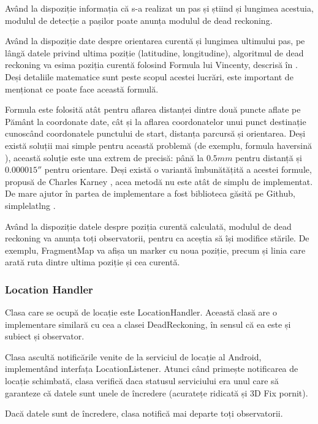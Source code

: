\documentclass[12pt, a4paper, oneside]{article}
\begin{document}
Având la dispoziție informația că s-a realizat un pas și știind și lungimea acestuia, modulul de detecție a pașilor poate anunța modulul de dead reckoning.

Având la dispoziție date despre orientarea curentă și lungimea ultimului pas, pe lângă datele privind ultima poziție (latitudine, longitudine), algoritmul de dead reckoning va esima poziția curentă folosind Formula lui Vincenty, descrisă în \cite{VincentyFormulae}. Deși detaliile matematice sunt peste scopul acestei lucrări, este important de menționat ce poate face această formulă. 

Formula este folosită atât pentru aflarea distanței dintre două puncte aflate pe Pământ la coordonate date, cât și la aflarea coordonatelor unui punct destinație cunoscând coordonatele punctului de start, distanța parcursă și orientarea. Deși există soluții mai simple pentru această problemă (de exemplu, formula haversină \cite{HaversineFormula}), această soluție este una extrem de precisă: până la $0.5mm$ pentru distanță și $0.000015″$ pentru orientare. Deși există o variantă îmbunătățită a acestei formule, propusă de Charles Karney \cite{Karney2013}, acea metodă nu este atât de simplu de implementat. De mare ajutor în partea de implementare a fost biblioteca găsită pe Github, simplelatlng \cite{simplelatlng}.

Având la dispoziție datele despre poziția curentă calculată, modulul de dead reckoning va anunța toți observatorii, pentru ca aceștia să își modifice stările. De exemplu, FragmentMap va afișa un marker cu noua poziție, precum și linia care arată ruta dintre ultima poziție și cea curentă.


\subsubsection{Location Handler} \label{LocationHandler}
Clasa care se ocupă de locație este LocationHandler. Această clasă are o implementare similară cu cea a clasei DeadReckoning, în sensul că ea este și subiect și observator. 

Clasa ascultă notificările venite de la serviciul de locație al Android, implementând interfața LocationListener. Atunci când primește notificarea de locație schimbată, clasa verifică daca statusul serviciului era unul care să garanteze că datele sunt unele de încredere (acuratețe ridicată și 3D Fix pornit).

Dacă datele sunt de încredere, clasa notifică mai departe toți observatorii.
\end{document}
